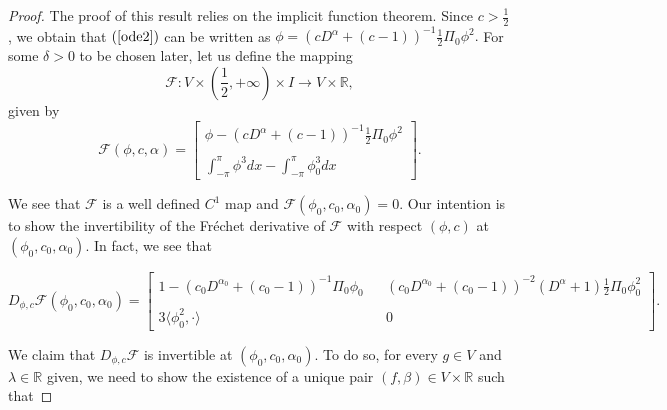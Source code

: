 \documentclass[12pt,reqno]{amsart}
\newcommand{\2}{L^2_{per}(0, T)}
\numberwithin{equation}{section}
\numberwithin{figure}{section}
\begin{document}
\begin{proof}
	The proof of this result relies on the implicit function theorem. Since $c>\frac{1}{2}$, we obtain that $(\ref{ode2})$ can be written as
	$\phi=\left(cD^{\alpha}+\left(c-1\right)\right)^{-1}\frac{1}{2}\Pi_0\phi^2.$
	For some $\delta>0$ to be chosen later, let us define the mapping
	\begin{equation}\label{map-ift-uniq1}
	\mathcal{F}: V\times \left(\frac{1}{2},+\infty\right)\times I\rightarrow V\times \mathbb{R},
	\end{equation}
	given by
	\begin{equation}\label{map-ift-uniq2}
	\mathcal{F}(\phi,c,\alpha)=\left[\begin{array}{ccccc} \displaystyle\phi-\left(cD^{\alpha}+\left(c-1\right)\right)^{-1}\frac{1}{2}\Pi_0\phi^2\\\\
\displaystyle	\int_{-\pi}^{\pi}\phi^3dx-\int_{-\pi}^{\pi}\phi_{0}^3dx\end{array}\right].
	\end{equation}
	
	
	We see that $\mathcal{F}$ is a well defined $C^1$ map and $\mathcal{F}(\phi_{0},c_{0},\alpha_0)=0$. Our intention is to show the invertibility of the Fr\'echet derivative
	of $\mathcal{F}$ with respect $(\phi, c)$ at $(\phi_{0}, c_{0},\alpha_0)$. In fact, we see that
	
	
	$$
	D_{\phi,c}\mathcal{F}(\phi_0,c_0,\alpha_0)=\left[\begin{array}{ccccc} 1-(c_0D^{\alpha_0}+(c_0-1))^{-1}\Pi_0\phi_0 & & \displaystyle (c_0D^{\alpha_0}+(c_0-1))^{-2}(D^{\alpha}+1)\frac{1}{2}\Pi_0\phi_0^2\\\\
\displaystyle	3\langle\phi_0^2,\cdot\rangle & & 0\end{array}\right].
	$$
	
	We claim that $D_{\phi,c}\mathcal{F}$ is invertible at $(\phi_0,c_0,\alpha_0)$. To do so, for every $g\in V$ and $\lambda\in \mathbb{R}$ given, we need to show the existence of a unique pair $(f,\beta)\in V\times\mathbb{R}$ such that
	

\end{proof}
\end{document}

